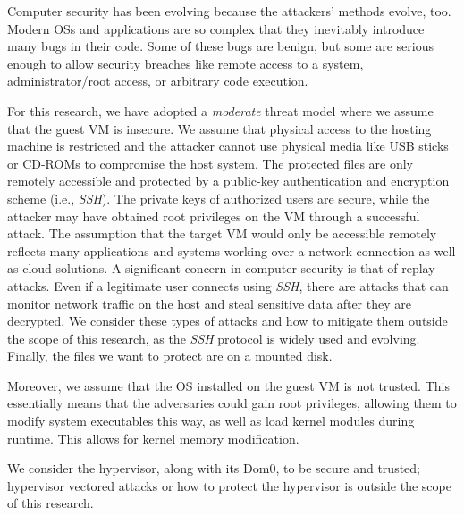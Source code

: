 Computer security has been evolving because the attackers' methods evolve, too. Modern \acp{OS} and applications are so complex that they inevitably introduce many bugs in their code. Some of these bugs are benign, but some are serious enough to allow security breaches like remote access to a system, administrator/root access, or arbitrary code execution.

\par For this research, we have adopted a \emph{moderate} threat model where we assume that the guest \ac{VM} is insecure. We assume that physical access to the hosting machine is restricted and the attacker cannot use physical media like USB sticks or CD-ROMs to compromise the host system. The protected files are only remotely accessible and protected  by  a  public-key  authentication  and  encryption scheme (i.e., \emph{SSH}). The  private  keys  of  authorized  users  are  secure, while the attacker may have obtained root privileges on the \ac{VM} through a successful attack. The assumption that the target \ac{VM} would only be accessible remotely reflects many applications and systems working over a network connection as well as cloud solutions. A significant  concern  in  computer security is that of replay attacks. Even if a legitimate user connects using \emph{SSH}, there are attacks that can monitor  network  traffic  on  the  host  and  steal  sensitive data after they are decrypted. We consider these types of attacks and how to mitigate them outside the scope of this research, as the \emph{SSH} protocol is widely used and evolving. Finally, the files we want to protect are on a mounted disk.

\par Moreover, we assume that the \ac{OS} installed on the guest \ac{VM} is not trusted. This essentially means that the adversaries could gain root privileges, allowing them to modify system executables this way, as well as load kernel modules during runtime. This allows for kernel memory modification.

\par We consider the hypervisor, along with its Dom0, to be secure and trusted; hypervisor vectored attacks or how to protect the hypervisor is outside the scope of this research.

